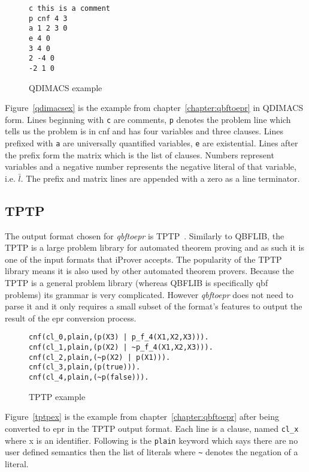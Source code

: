 \begin{figure}[H]
\caption{QDIMACS example}
\begin{CenteredBox}
\begin{lstlisting}[label=qdimacsex]
c this is a comment
p cnf 4 3
a 1 2 3 0
e 4 0
3 4 0
2 -4 0
-2 1 0
\end{lstlisting}
\end{CenteredBox}
\end{figure}
Figure~\ref{qdimacsex} is the example from chapter~\ref{chapter:qbftoepr} in QDIMACS form. Lines beginning with \texttt{c} are comments, \texttt{p} denotes the problem line which tells us the problem is in \gls{cnf} and has four variables and three clauses. Lines prefixed with \texttt{a} are universally quantified variables, \texttt{e} are existential. Lines after the prefix form the matrix which is the list of clauses. Numbers represent variables and a negative number represents the negative literal of that variable, i.e. $\bar{l}$. The prefix and matrix lines are appended with a zero as a line terminator.

\subsection{TPTP}
The output format chosen for \textit{qbftoepr} is TPTP~\cite{tptp}. Similarly to QBFLIB, the TPTP is a large problem library for automated theorem proving and as such it is one of the input formats that iProver accepts. The popularity of the TPTP library means it is also used by other automated theorem provers. Because the TPTP is a general problem library (whereas QBFLIB is specifically \gls{qbf} problems) its grammar is very complicated. However \textit{qbftoepr} does not need to parse it and it only requires a small subset of the format's features to output the result of the \gls{epr} conversion process.

\begin{figure}[H]
\caption{TPTP example}
\begin{CenteredBox}
\begin{lstlisting}[label=tptpex]
cnf(cl_0,plain,(p(X3) | p_f_4(X1,X2,X3))).
cnf(cl_1,plain,(p(X2) | ~p_f_4(X1,X2,X3))).
cnf(cl_2,plain,(~p(X2) | p(X1))).
cnf(cl_3,plain,(p(true))).
cnf(cl_4,plain,(~p(false))).
\end{lstlisting}
\end{CenteredBox}
\end{figure}
Figure~\ref{tptpex} is the example from chapter~\ref{chapter:qbftoepr} after being converted to \gls{epr} in the TPTP output format. Each line is a clause, named \texttt{cl\_x} where x is an identifier. Following is the \texttt{plain} keyword which says there are no user defined semantics then the list of literals where \texttt{\textasciitilde} denotes the negation of a literal.

